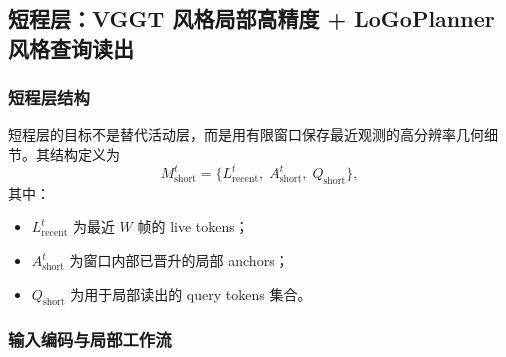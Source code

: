 \documentclass[12pt]{article}
\begin{document}
\subsection{短程层：VGGT 风格局部高精度 + LoGoPlanner 风格查询读出}

\subsubsection{短程层结构}

短程层的目标不是替代活动层，而是用有限窗口保存最近观测的高分辨率几何细节。其结构定义为
\begin{equation}
M_{\text{short}}^t = \{L_{\text{recent}}^t,\; A_{\text{short}}^t,\; Q_{\text{short}}\},
\end{equation}
其中：
\begin{itemize}
  \item $L_{\text{recent}}^t$ 为最近 $W$ 帧的 live tokens；
  \item $A_{\text{short}}^t$ 为窗口内部已晋升的局部 anchors；
  \item $Q_{\text{short}}$ 为用于局部读出的 query tokens 集合。
\end{itemize}

\subsubsection{输入编码与局部工作流}
\end{document}
